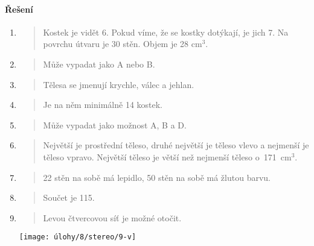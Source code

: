 \paragraph{Řešení}
\begin{enumerate}
    \item
    \begin{quote}
        Kostek je vidět 6. Pokud víme, že se kostky dotýkají, je jich 7. Na povrchu útvaru je 30 stěn. Objem je 28 cm$^{3}$.
    \end{quote}

    \item
    \begin{quote}
        Může vypadat jako A nebo B.
    \end{quote}

    \item
    \begin{quote}
        Tělesa se jmenují krychle, válec a jehlan.
    \end{quote}

    \item
    \begin{quote}
        Je na něm minimálně 14 kostek.
    \end{quote}

    \item
    \begin{quote}
        Může vypadat jako možnost A, B a D.
    \end{quote}

    \item
    \begin{quote}
        Největší je prostřední těleso, druhé největší je těleso vlevo a nejmenší je těleso vpravo. Největší těleso je větší než nejmenší těleso o~171~cm$^{3}$.
    \end{quote}

    \item
    \begin{quote}
        22 stěn na sobě má lepidlo, 50 stěn na sobě má žlutou barvu.
    \end{quote}

    \item
    \begin{quote}
        Součet je 115.
    \end{quote}

    \item
    \begin{minipage}[t]{\linewidth}
        \begin{quote}
            Levou čtvercovou síť je možné otočit.
        \end{quote}
        \centering
        \texttt{[image: úlohy/8/stereo/9-v]}
    \end{minipage}


\end{enumerate}

